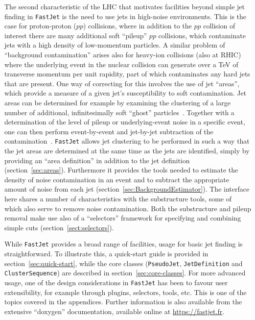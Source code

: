 \documentclass[12pt,a4]{article}
\newcommand{\fastjet}{\texttt{FastJet}\xspace}
\newcommand{\ttt}[1]{{\small\texttt{#1}}}
\begin{document}
The second characteristic of the LHC that motivates facilities beyond
simple jet finding in \fastjet is the need to use jets in high-noise
environments.
%
This is the case for proton-proton ($pp$) collisions, where in
addition to the $pp$ collision of interest there are many additional
soft ``pileup'' $pp$ collisions, which contaminate jets with a high
density of low-momentum particles.
%
A similar problem of ``background contamination'' arises also for
heavy-ion collisions (also at RHIC) where the underlying event in the
nuclear collision can generate over a TeV of transverse momentum per
unit rapidity, part of which contaminates any hard jets that are
present.
%
One way of correcting for this involves the use of jet ``areas'',
which provide a measure of a given jet's susceptibility to soft
contamination.
%
Jet areas can be determined for example by examining the clustering of
a large number of additional, infinitesimally soft ``ghost''
particles~\cite{CSSAreas}.
%
Together with a determination of the level of pileup or
underlying-event noise in a specific event, one can then perform
event-by-event and 
jet-by-jet subtraction of the
contamination~\cite{cs,Cacciari:2010te}. 
%
\fastjet allows jet clustering to be performed in such a way that the
jet areas are determined at the same time as the jets are identified,
simply by providing an ``area definition'' in addition to the jet
definition (section~\ref{sec:areas}).
%
Furthermore it provides the tools needed to estimate the density of
noise contamination in an event and to subtract the appropriate amount
of noise from each jet (section~\ref{sec:BackgroundEstimator}).
%
The interface here shares a number of characteristics with the
substructure tools, some of which also serve to remove noise
contamination. Both the substructure and pileup removal make use
also of a ``selectors'' framework for specifying and combining simple
cuts (section~\ref{sect:selectors}).

While \fastjet provides a broad range of facilities, usage for basic
jet finding is straightforward.
%
To illustrate this, a quick-start guide is provided in
section~\ref{sec:quick-start}, while the core classes
(\ttt{PseudoJet}, \ttt{JetDefinition} and \ttt{ClusterSequence}) are
described in section~\ref{sec:core-classes}.
%
For more advanced usage, one of the design considerations in \fastjet
has been to favour user extensibility, for example through plugins,
selectors, tools, etc. This is one of the topics covered in the
appendices.
%
Further information is also available from the extensive 
``doxygen'' documentation, available online at
\url{https://fastjet.fr}.
\end{document}
